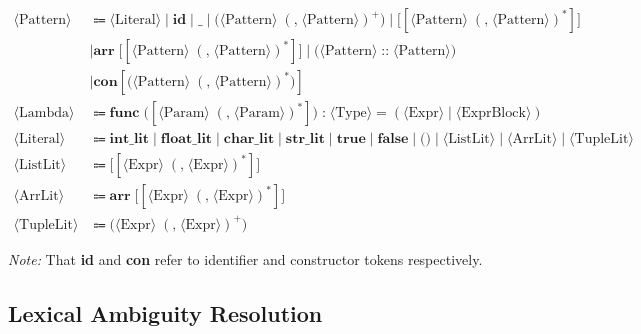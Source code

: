 \documentclass[11pt, a4paper]{article}
\begin{document}
\begin{align*}
    \langle \text{Pattern} \rangle &\Coloneqq \langle \text{Literal} \rangle \mid \textbf{id} \mid \_  \mid \textbf{(} \langle \text{Pattern} \rangle \; (\textbf{,} \; \langle \text{Pattern} \rangle)^+ \textbf{)} \mid \textbf{[}[\langle \text{Pattern} \rangle \; (\textbf{,} \; \langle \text{Pattern} \rangle)^*]\textbf{]} \\
    &\mid \textbf{arr} \; \textbf{[}[\langle \text{Pattern} \rangle \; (\textbf{,} \; \langle \text{Pattern} \rangle)^*]\textbf{]} \mid \textbf{(} \langle \text{Pattern} \rangle \; \textbf{::} \; \langle \text{Pattern} \rangle \textbf{)} \\ 
    &\mid \textbf{con} [\textbf{(} \langle \text{Pattern} \rangle \; (\textbf{,} \; \langle \text{Pattern} \rangle)^*\textbf{)}] \\
    \langle \text{Lambda} \rangle &\Coloneqq \textbf{func} \; \textbf{(} [\langle \text{Param} \rangle \; (\textbf{,} \; \langle \text{Param} \rangle)^*] \textbf{)} \; \textbf{:} \; \langle \text{Type} \rangle \; \textbf{=} \; (\langle \text{Expr} \rangle \mid \langle \text{ExprBlock} \rangle) \\
    \langle \text{Literal} \rangle &\Coloneqq \textbf{int\_lit} \mid \textbf{float\_lit} \mid \textbf{char\_lit} \mid \textbf{str\_lit} \mid \textbf{true} \mid \textbf{false} \mid \textbf{()} \mid \langle \text{ListLit} \rangle \mid \langle \text{ArrLit} \rangle \mid \langle \text{TupleLit} \rangle \\
    \langle \text{ListLit} \rangle &\Coloneqq \textbf{[} [\langle \text{Expr} \rangle \; (\textbf{,} \; \langle \text{Expr} \rangle)^*] \textbf{]} \\
    \langle \text{ArrLit} \rangle &\Coloneqq \textbf{arr} \; \textbf{[} [\langle \text{Expr} \rangle \; (\textbf{,} \; \langle \text{Expr} \rangle)^*] \textbf{]} \\
    \langle \text{TupleLit} \rangle &\Coloneqq \textbf{(} \langle \text{Expr} \rangle \; (\textbf{,} \; \langle \text{Expr} \rangle)^+ \textbf{)}
\end{align*}

\textit{Note:} That \textbf{id} and \textbf{con} refer to identifier and constructor tokens respectively.

\subsection{Lexical Ambiguity Resolution}
\end{document}
